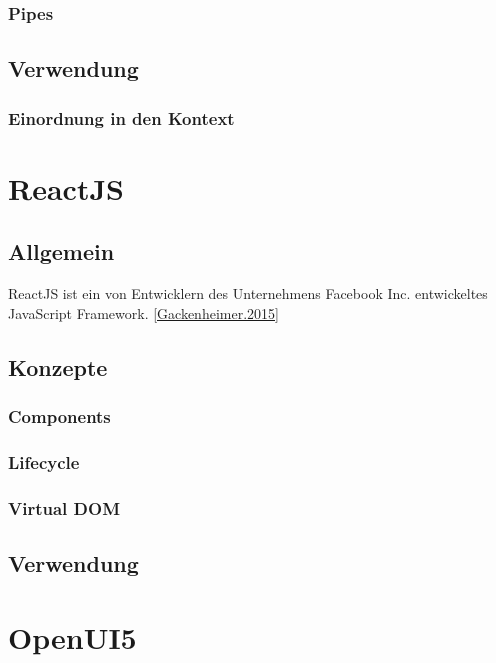 \subsubsection{Pipes} 





\subsection{Verwendung}

\subsubsection{Einordnung in den Kontext}


\section{ReactJS}

\subsection{Allgemein}


ReactJS ist ein von Entwicklern des Unternehmens Facebook Inc. entwickeltes JavaScript Framework. \autoref{Gackenheimer.2015} 


%



\subsection{Konzepte}

\subsubsection{Components}



\subsubsection{Lifecycle}

\subsubsection{Virtual DOM}

\subsection{Verwendung}




\section{OpenUI5}